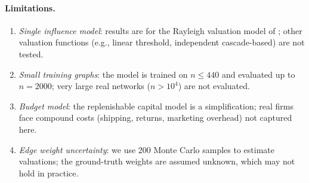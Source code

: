 \paragraph{Limitations.}
\begin{enumerate}[leftmargin=*,topsep=2pt,itemsep=1pt]
  \item \emph{Single influence model}: results are for the Rayleigh valuation model
    of \citet{babaei2013revenue}; other valuation functions (e.g., linear threshold,
    independent cascade-based) are not tested.
  \item \emph{Small training graphs}: the model is trained on $n \le 440$ and
    evaluated up to $n{=}2000$; very large real networks ($n > 10^4$) are not
    evaluated.
  \item \emph{Budget model}: the replenishable capital model is a simplification;
    real firms face compound costs (shipping, returns, marketing overhead) not
    captured here.
  \item \emph{Edge weight uncertainty}: we use 200 Monte Carlo samples to estimate
    valuations; the ground-truth weights are assumed unknown, which may not hold
    in practice.
\end{enumerate}
